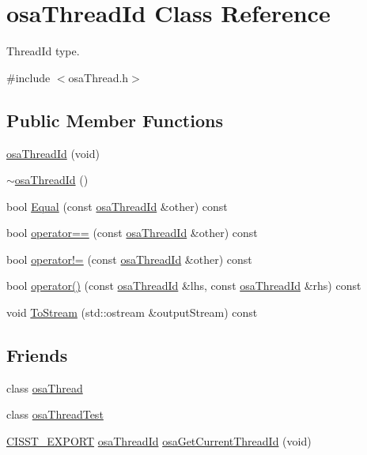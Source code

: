 \hypertarget{classosa_thread_id}{\section{osa\-Thread\-Id Class Reference}
\label{classosa_thread_id}
}


Thread\-Id type.  




{\ttfamily \#include $<$osa\-Thread.\-h$>$}

\subsection*{Public Member Functions}
\begin{DoxyCompactItemize}
\item 
\hyperlink{classosa_thread_id_aeb44a37d0492c197b9cb22b7b039d242}{osa\-Thread\-Id} (void)
\item 
\hyperlink{classosa_thread_id_aea58cbec56c88f6546800ef9e59b70e8}{$\sim$osa\-Thread\-Id} ()
\item 
bool \hyperlink{classosa_thread_id_a2fec44f6d2c93dd3df13d70a7bd4a8d4}{Equal} (const \hyperlink{classosa_thread_id}{osa\-Thread\-Id} \&other) const 
\item 
bool \hyperlink{classosa_thread_id_a93c9520bdd2ce99a76c22fe0e615b6d2}{operator==} (const \hyperlink{classosa_thread_id}{osa\-Thread\-Id} \&other) const 
\item 
bool \hyperlink{classosa_thread_id_a398145889ad5594d5a08a9f74ba1ec2b}{operator!=} (const \hyperlink{classosa_thread_id}{osa\-Thread\-Id} \&other) const 
\item 
bool \hyperlink{classosa_thread_id_a37b34e88b38585f7f34ef043bf39e6dd}{operator()} (const \hyperlink{classosa_thread_id}{osa\-Thread\-Id} \&lhs, const \hyperlink{classosa_thread_id}{osa\-Thread\-Id} \&rhs) const 
\item 
void \hyperlink{classosa_thread_id_afb21803bee3dbe0d721a4c6b6737e2df}{To\-Stream} (std\-::ostream \&output\-Stream) const 
\end{DoxyCompactItemize}
\subsection*{Friends}
\begin{DoxyCompactItemize}
\item 
class \hyperlink{classosa_thread_id_a35e7a1b0202c45103302d0073f377e57}{osa\-Thread}
\item 
class \hyperlink{classosa_thread_id_a542e7acdd9a832dddf65bf204d2df936}{osa\-Thread\-Test}
\item 
\hyperlink{cmn_export_macros_8h_a99393e0c3ac434b2605235bbe20684f8}{C\-I\-S\-S\-T\-\_\-\-E\-X\-P\-O\-R\-T} \hyperlink{classosa_thread_id}{osa\-Thread\-Id} \hyperlink{classosa_thread_id_ab77759b2805dbd140c65481a68760ab5}{osa\-Get\-Current\-Thread\-Id} (void)
\end{DoxyCompactItemize}


